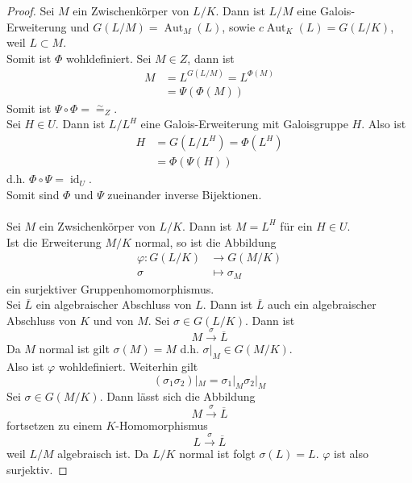 \documentclass[10pt,a4paper]{article}
\newcommand{\ol}[1]{\overline{#1}}
\newcommand{\id}{\operatorname{id}}
\newcommand{\isom}{\overset{\sim}{=}}
\newcommand{\Aut}{\operatorname{Aut}}
\theoremstyle{plain}
\theoremstyle{definition}
\theoremstyle{remark}
\begin{document}
	\begin{proof}
		Sei $M$ ein Zwischenkörper von $L/K$. Dann ist $L/M$ eine Galois-Erweiterung und $G(L/M)=\Aut_M(L)$, sowie $c\Aut_K(L)=G(L/K)$, weil $L\subset M$.\\
		Somit ist $\Phi$ wohldefiniert. Sei $M\in Z$, dann ist
		\begin{align*}
		M&=L^{G(L/M)}=L^{\Phi(M)}\\
		&=\Psi(\Phi(M))
		\end{align*}
		Somit ist $\Psi\circ\Phi=\isom_Z$.\\
		Sei $H\in U$. Dann ist $L/L^H$ eine Galois-Erweiterung mit Galoisgruppe $H$. Also ist
		\begin{align*}
		H&=G(L/L^H)=\Phi(L^H)\\
		&=\Phi(\Psi(H))
		\end{align*}
		d.h. $\Phi\circ\Psi=\id_U$.\\
		Somit sind $\Phi$ und $\Psi$ zueinander inverse Bijektionen.\\
		\\
		Sei $M$ ein Zwsichenkörper von $L/K$. Dann ist $M=L^H$ für ein $H\in U$.\\
		Ist die Erweiterung $M/K$ normal, so ist die Abbildung
		\begin{align*}
		\varphi:G(L/K)&\to G(M/K)\\
		\sigma&\mapsto \sigma_M
		\end{align*}
		ein surjektiver Gruppenhomomorphismus.\\
		Sei $\ol L$ ein algebraischer Abschluss von $L$. Dann ist $\ol L$ auch ein algebraischer Abschluss von $K$ und von $M$. Sei $\sigma\in G(L/K)$. Dann ist
		\[M\xrightarrow{\sigma}\ol L\]
		Da $M$ normal ist gilt $\sigma(M)=M$ d.h. $\sigma|_M\in G(M/K)$.\\
		Also ist $\varphi$ wohldefiniert. Weiterhin gilt
		\[(\sigma_1\sigma_2)|_M=\sigma_1|_M\sigma_2|_M\]
		Sei $\sigma\in G(M/K)$. Dann lässt sich die Abbildung
		\[M\xrightarrow{\sigma}\ol L\]
		fortsetzen zu einem $K$-Homomorphismus
		\[L\xrightarrow{\sigma}\ol L\]
		weil $L/M$ algebraisch ist. Da $L/K$ normal ist folgt $\sigma(L)=L$. $\varphi$ ist also surjektiv.
	\end{proof}
\end{document}
